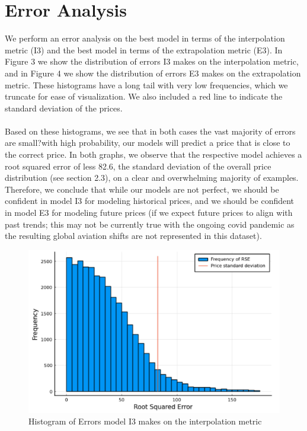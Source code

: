 \documentclass{article}
\begin{document}
\section{Error Analysis}
We perform an error analysis on the best model in terms of the interpolation metric (I3) and the best model in terms of the extrapolation metric (E3). In Figure 3 we show the distribution of errors I3 makes on the interpolation metric, and in Figure 4 we show the distribution of errors E3 makes on the extrapolation metric. These histograms have a long tail with very low frequencies, which we truncate for ease of visualization. We also included a red line to indicate the standard deviation of the prices.\\\\
Based on these histograms, we see that in both cases the vast majority of errors are small?with high probability, our models will predict a price that is close to the correct price. In both graphs, we observe that the respective model achieves a root squared error of less 82.6, the standard deviation of the overall price distribution (see section 2.3), on a clear and overwhelming majority of examples. Therefore, we conclude that while our models are not perfect, we should be confident in model I3 for modeling historical prices, and we should be confident in model E3 for modeling future prices (if we expect future prices to align with past trends; this may not be currently true with the ongoing covid pandemic as the resulting global aviation shifts are not represented in this dataset).   

\begin{figure}[h]
\centering
\includegraphics[scale=.40]{images/I3_Ierrors.png}
\caption{Histogram of Errors model I3 makes on the interpolation metric}
\end{figure}
\end{document}
